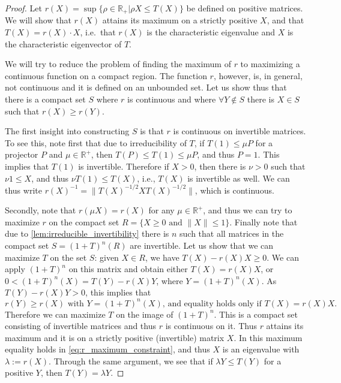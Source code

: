\documentclass{article}
\begin{document}
\begin{proof}
  Let $r(X) = \sup \{\rho\in \mathbb{R}_+| \rho X \leq T(X) \}$ be defined on positive matrices. We will show that $r(X)$ attains its maximum on a strictly positive $X$, and that $T(X) = r(X)\cdot X$, i.e.\ that $r(X)$ is the characteristic eigenvalue and $X$ is the characteristic eigenvector of  $T$.  
  
  We will try to reduce the problem of finding the maximum of $r$ to maximizing a continuous function on a compact region. The function $r$, however, is, in general, not continuous and it is defined on an unbounded set. Let us show thus that there is a compact set $S$ where $r$ is continuous and where $\forall Y\notin S$ there is $X\in S$ such that $r(X)\geq r(Y)$. 
  
  The first insight into constructing $S$ is that $r$ is continuous on invertible matrices. To see this, note first that due to irreducibility of $T$, if $T(1)\leq \mu P$ for a projector $P$ and $\mu\in \mathbb{R}^+$, then $T(P)\leq T(1) \leq \mu P$, and thus $P=1$. This implies that $T(1)$ is invertible. Therefore if $X>0$, then there is $\nu>0$ such that $\nu 1 \leq X$, and thus $ \nu T(1)\leq T(X)$, i.e., $T(X)$ is invertible as well. We can thus write $r(X)^{-1} = \|T(X)^{-1/2}X T(X)^{-1/2}\|$, which is continuous.
  
  Secondly, note that $r(\mu X) = r(X)$ for any $\mu\in\mathbb{R}^+$, and thus we can try to maximize $r$ on the compact set $R = \{ X\geq 0 \text{ and } \|X\|\leq 1\}$. Finally note that due to \cref{lem:irreducible_invertibility} there is $n$ such that all matrices in the compact set $S = (1+T)^n(R)$ are invertible. Let us show that we can maximize $T$ on the set $S$: given $X\in R$, we have $T(X) - r(X) X\geq 0$. We can apply $(1+T)^n$ on this matrix and obtain either $T(X) = r(X) X$, or $0 < (1+T)^n(X) = T(Y)- r(X) Y$, where $Y = (1+T)^n(X)$. As $T(Y)- r(X) Y> 0$, this implies that 
  \begin{equation}\label{eq:r_maximum_constraint}
    r(Y) \geq r(X) \text{ with $Y = (1+T)^n(X)$, and equality holds only if  $T(X) = r(X) X$}.
  \end{equation}
  Therefore we can maximize $T$ on the image of $(1+T)^n$. This is a compact set consisting of invertible matrices and thus $r$ is continuous on it. Thus $r$ attains its maximum and it is on a strictly positive (invertible) matrix $X$. In this maximum equality holds in \cref{eq:r_maximum_constraint}, and thus $X$ is an eigenvalue with $\lambda:=r(X)$. Through the same argument, we see that if $\lambda Y \leq T(Y)$ for a positive $Y$, then $T(Y) = \lambda Y$. 
  

\end{proof}
\end{document}
